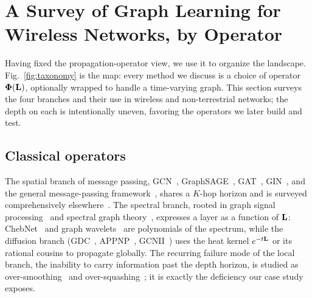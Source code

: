 \section{A Survey of Graph Learning for Wireless Networks, by Operator}
\label{sec:survey}

Having fixed the propagation-operator view, we use it to organize the landscape.
Fig.~\ref{fig:taxonomy} is the map: every method we discuss is a choice of operator
$\boldsymbol{\Phi}(\mathbf{L})$, optionally wrapped to handle a time-varying graph. This section surveys
the four branches and their use in wireless and non-terrestrial networks; the depth on
each is intentionally uneven, favoring the operators we later build and test.



\subsection{Classical operators}
The spatial branch of message passing, GCN~\cite{kipf2017gcn},
GraphSAGE~\cite{hamilton2017graphsage}, GAT~\cite{velickovic2018gat},
GIN~\cite{xu2019gin}, and the general message-passing framework~\cite{gilmer2017mpnn},
shares a $K$-hop horizon and is surveyed comprehensively
elsewhere~\cite{wu2021gnnsurvey,zhou2020gnnreview,bronstein2017geometric}. The spectral
branch, rooted in graph signal processing~\cite{shuman2013gsp,ortega2018gsp} and spectral
graph theory~\cite{chung1997spectral}, expresses a layer as a function of $\mathbf{L}$:
ChebNet~\cite{defferrard2016chebnet} and graph wavelets~\cite{hammond2011wavelets} are
polynomials of the spectrum, while the diffusion branch
(GDC~\cite{gasteiger2019diffusion}, APPNP~\cite{gasteiger2019appnp},
GCNII~\cite{chen2020gcnii}) uses the heat kernel $e^{-t\mathbf{L}}$ or its rational cousins to
propagate globally. The recurring failure mode of the local branch, the inability to
carry information past the depth horizon, is studied as over-smoothing~\cite{li2018deeper}
and over-squashing~\cite{alon2021bottleneck,topping2022oversquashing}; it is exactly the
deficiency our case study exposes.

